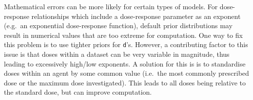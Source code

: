 \documentclass[]{article}
\newenvironment{Shaded}{\begin{snugshade}}{\end{snugshade}}
\newcommand{\CommentTok}[1]{\textcolor[rgb]{0.56,0.35,0.01}{\textit{#1}}}
\newcommand{\DataTypeTok}[1]{\textcolor[rgb]{0.13,0.29,0.53}{#1}}
\newcommand{\DecValTok}[1]{\textcolor[rgb]{0.00,0.00,0.81}{#1}}
\newcommand{\ErrorTok}[1]{\textcolor[rgb]{0.64,0.00,0.00}{\textbf{#1}}}
\newcommand{\KeywordTok}[1]{\textcolor[rgb]{0.13,0.29,0.53}{\textbf{#1}}}
\newcommand{\NormalTok}[1]{#1}
\newcommand{\OperatorTok}[1]{\textcolor[rgb]{0.81,0.36,0.00}{\textbf{#1}}}
\newcommand{\StringTok}[1]{\textcolor[rgb]{0.31,0.60,0.02}{#1}}
\begin{document}
Mathematical errors can be more likely for certain types of models. For
dose-response relationships which include a dose-response parameter as
an exponent (e.g.~an exponential dose-response function), default prior
distributions may result in numerical values that are too extreme for
computation. One way to fix this problem is to use tighter priors for
\texttt{d}'s. However, a contributing factor to this issue is that doses
within a dataset can be very variable in magnitude, thus leading to
excessively high/low exponents. A solution for this is is to standardise
doses within an agent by some common value (i.e.~the most commonly
prescribed dose or the maximum dose investigated). This leads to all
doses being relative to the standard dose, but can improve computation.

\begin{Shaded}
\end{Shaded}
\end{document}
